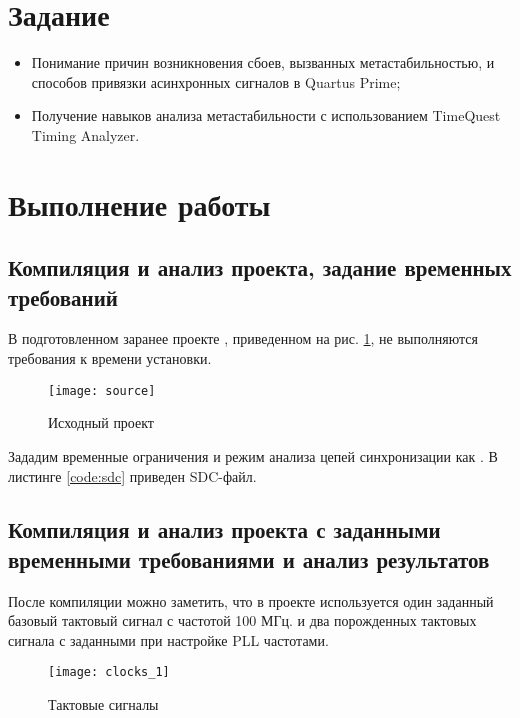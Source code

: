 





\newpage

\section{Задание}

\begin{itemize}
	\item Понимание причин возникновения сбоев, вызванных метастабильностью, и способов привязки асинхронных сигналов в Quartus Prime;
	\item Получение навыков анализа метастабильности с использованием TimeQuest Timing Analyzer.
\end{itemize}

\section{Выполнение работы}

\subsection{Компиляция и анализ проекта, задание временных требований}

В подготовленном заранее проекте , приведенном на рис. \ref{fig:source}, не выполняются требования к времени установки.
\begin{figure}[H]
	\begin{center}
		\texttt{[image: source]}
		\caption{Исходный проект}
		\label{fig:source}
	\end{center}
\end{figure}

Зададим временные ограничения и режим анализа цепей синхронизации как . В листинге \ref{code:sdc} приведен SDC-файл.

\vspace{0.5cm}


\subsection{Компиляция и анализ проекта с заданными временными требованиями и анализ результатов}

После компиляции можно заметить, что в проекте используется один заданный базовый тактовый сигнал с частотой 100 МГц. и два порожденных тактовых сигнала с заданными при настройке PLL частотами.
\begin{figure}[H]
	\begin{center}
		\texttt{[image: clocks\_1]}
		\caption{Тактовые сигналы}
		\label{fig:clocks_1}
	\end{center}
\end{figure}

